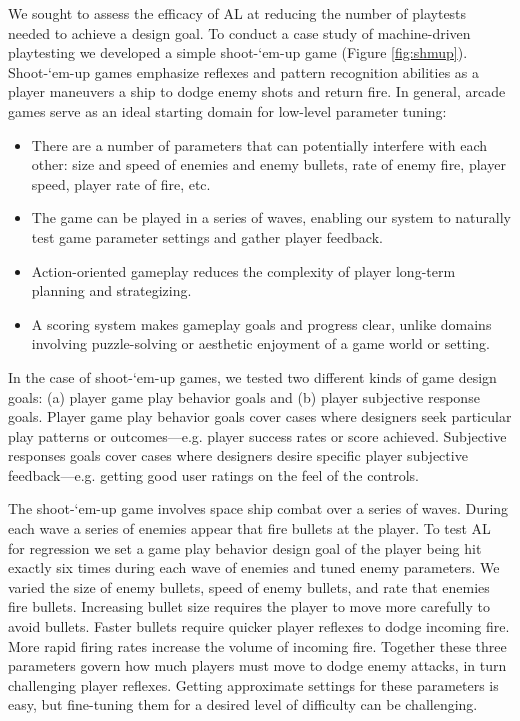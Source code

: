 \documentclass{sig-alternate}
\begin{document}
We sought to assess the efficacy of AL at reducing the number of playtests needed to achieve a design goal.
To conduct a case study of machine-driven playtesting we developed a simple shoot-`em-up game (Figure \ref{fig:shmup}).
Shoot-`em-up games emphasize reflexes and pattern recognition abilities as a player maneuvers a ship to dodge enemy shots and return fire.
%
In general, arcade games serve as an ideal starting domain for low-level parameter tuning:
\begin{itemize}
\item There are a number of parameters that can potentially interfere with each other: size and speed of enemies and enemy bullets, rate of enemy fire, player speed, player rate of fire, etc.
\item The game can be played in a series of waves, enabling our system to naturally test game parameter settings and gather player feedback.
\item Action-oriented gameplay reduces the complexity of player long-term planning and strategizing.
\item A scoring system makes gameplay goals and progress clear, unlike domains involving puzzle-solving or aesthetic enjoyment of a game world or setting.
\end{itemize}
%
In the case of shoot-`em-up games, we tested two different kinds of game design goals: (a) player game play behavior goals and (b) player subjective response goals.
Player game play behavior goals cover cases where designers seek particular play patterns or outcomes---e.g. player success rates or score achieved. 
Subjective responses goals cover cases where designers desire specific player subjective feedback---e.g. getting good user ratings on the feel of the controls.


The shoot-`em-up game involves space ship combat over a series of waves.
During each wave a series of enemies appear that fire bullets at the player. 
To test AL for regression we set a game play behavior design goal of the player being hit exactly six times during each wave of enemies and tuned enemy parameters.
We varied the size of enemy bullets, speed of enemy bullets, and rate that enemies fire bullets. 
Increasing bullet size requires the player to move more carefully to avoid bullets. 
Faster bullets require quicker player reflexes to dodge incoming fire. 
More rapid firing rates increase the volume of incoming fire. 
Together these three parameters govern how much players must move to dodge enemy attacks, in turn challenging player reflexes. 
Getting approximate settings for these parameters is easy, but fine-tuning them for a desired level of difficulty can be challenging. 
\end{document}
